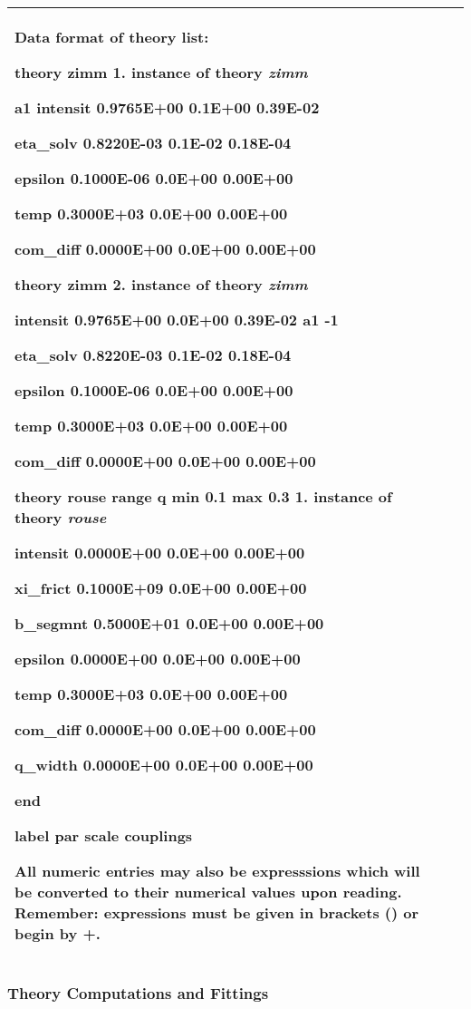 \documentclass[]{article}
\begin{document}
\begin{longtable}[]{@{}ll@{}}
\begin{minipage}[t]{0.47\columnwidth}
\textbf{Data format of theory list:}

theory zimm \textbf{1. instance of theory \emph{zimm}}

a1 intensit 0.9765E+00 0.1E+00 0.39E-02

eta\_solv 0.8220E-03 0.1E-02 0.18E-04

epsilon 0.1000E-06 0.0E+00 0.00E+00

temp 0.3000E+03 0.0E+00 0.00E+00

com\_diff 0.0000E+00 0.0E+00 0.00E+00

theory zimm \textbf{2. instance of theory \emph{zimm}}

intensit 0.9765E+00 0.0E+00 0.39E-02 a1 -1

eta\_solv 0.8220E-03 0.1E-02 0.18E-04

epsilon 0.1000E-06 0.0E+00 0.00E+00

temp 0.3000E+03 0.0E+00 0.00E+00

com\_diff 0.0000E+00 0.0E+00 0.00E+00

theory rouse range q min 0.1 max 0.3 \textbf{1. instance of theory
\emph{rouse}}

intensit 0.0000E+00 0.0E+00 0.00E+00

xi\_frict 0.1000E+09 0.0E+00 0.00E+00

b\_segmnt 0.5000E+01 0.0E+00 0.00E+00

epsilon 0.0000E+00 0.0E+00 0.00E+00

temp 0.3000E+03 0.0E+00 0.00E+00

com\_diff 0.0000E+00 0.0E+00 0.00E+00

q\_width 0.0000E+00 0.0E+00 0.00E+00

end

label par scale couplings

All numeric entries may also be expresssions which will be converted to
their numerical values upon reading. Remember: expressions must be given
in brackets () or begin by +.\strut
\end{minipage}\tabularnewline
\bottomrule
\end{longtable}

\hypertarget{theory-computations-and-fittings}{%
\subsubsection{Theory Computations and
Fittings}\label{theory-computations-and-fittings}}
\end{document}
